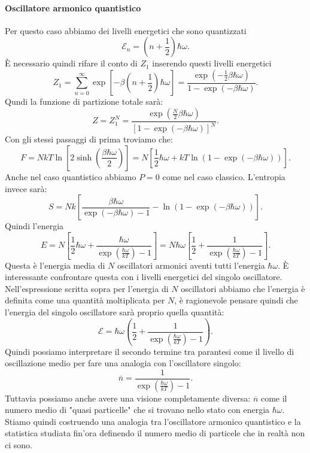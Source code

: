 \paragraph{Oscillatore armonico quantistico}
Per questo caso abbiamo dei livelli energetici che sono quantizzati
\[
	\mathcal{E} _{n}=\left( n + \frac{1}{2} \right) \hbar \omega 
.\] 
È necessario quindi rifare il conto di $Z_1$ inserendo questi livelli energetici
\[
	Z_1 = \sum_{n=0}^{\infty} \exp\left[ -\beta \left( n + \frac{1}{2} \right) \hbar\omega  \right] =
	\frac{\exp\left( -\frac{1}{2}\beta \hbar\omega  \right) }{1- \exp\left( -\beta \hbar\omega  \right) }
.\] 
Qundi la funzione di partizione totale sarà:
\[
	Z = Z_1^{N} = \frac{\exp\left( \frac{N}{2}\beta \hbar\omega  \right) }{\left[ 1-\exp\left( -\beta \hbar\omega  \right)  \right] ^N}
.\] 
Con gli stessi passaggi di prima troviamo che:
\[
    	F = NkT\ln\left[ 2\sinh\left( \frac{\beta \hbar\omega }{2} \right)  \right] = N \left[ \frac{1}{2} \hbar\omega + kT \ln\left( 1-\exp\left( -\beta \hbar\omega  \right)  \right)  \right] 
.\] 
Anche nel caso quantistico abbiamo $P=0$ come nel caso classico. L'entropia invece sarà:
\[
	S = Nk\left[ \frac{\beta \hbar\omega }{\exp\left( -\beta \hbar\omega  \right) -1} - \ln\left( 1-\exp\left( -\beta \hbar\omega  \right)  \right)  \right] 
.\] 
Quindi l'energia
\[
	E = N\left[ \frac{1}{2}\hbar\omega + \frac{\hbar\omega }{\exp\left( \frac{\hbar\omega }{kT} \right) -1} \right] =
	N\hbar\omega \left[ \frac{1}{2}+ \frac{1}{\exp\left( \frac{\hbar\omega }{kT} \right) -1} \right]
.\] 
Questa è l'energia media di $N$ oscillatori armonici aventi tutti l'energia $\hbar\omega $. È interessante confrontare questa con i livelli energetici del singolo oscillatore.
Nell'espressione scritta sopra per l'energia di $N$ oscillatori abbiamo che l'energia è definita come una quantità moltiplicata per $N$, è ragionevole pensare quindi che l'energia del singolo oscillatore sarà proprio quella quantità:
\[
	\mathcal{E} = \hbar\omega \left( \frac{1}{2} + \frac{1}{\exp\left( \frac{\hbar\omega }{kT} \right) -1} \right) 
.\] 
Quindi possiamo interpretare il secondo termine tra parantesi come il livello di oscillazione medio per fare una analogia con l'oscillatore singolo:
\[
	\overline{n} = \frac{1}{\exp\left( \frac{\hbar\omega }{kT} \right) -1}
.\] 
Tuttavia possiamo anche avere una visione completamente diversa: $\overline{n}$ come il numero medio di "quasi particelle" che si trovano nello stato con energia $\hbar\omega $. \\
Stiamo quindi costruendo una analogia tra l'oscillatore armonico quantistico e la statistica studiata fin'ora definendo il numero medio di particele che in realtà non ci sono.\\
